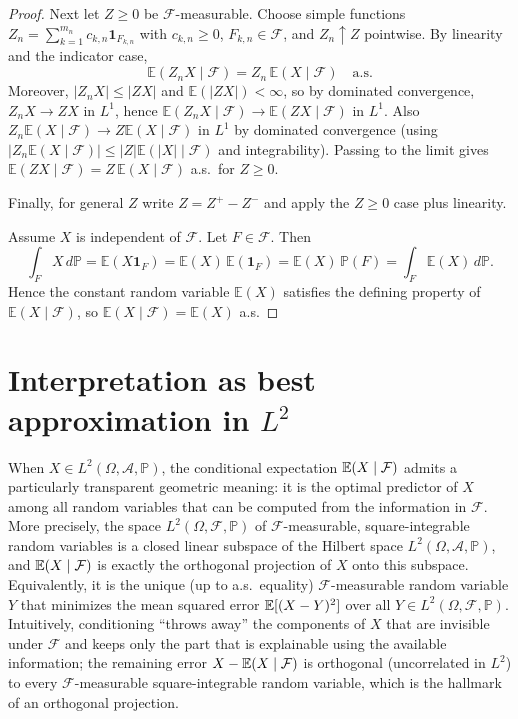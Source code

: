 \begin{proof}
Next let $Z\ge 0$ be $\mathcal F$-measurable. Choose simple functions $Z_n=\sum_{k=1}^{m_n} c_{k,n}\mathbf 1_{F_{k,n}}$
with $c_{k,n}\ge 0$, $F_{k,n}\in\mathcal F$, and $Z_n\uparrow Z$ pointwise.
By linearity and the indicator case,
\[
\mathbb E(Z_n X\mid\mathcal F)=Z_n\,\mathbb E(X\mid\mathcal F)\quad\text{a.s.}
\]
Moreover, $|Z_n X|\le |Z X|$ and $\mathbb E(|Z X|)<\infty$, so by dominated convergence,
$Z_n X\to Z X$ in $L^1$, hence $\mathbb E(Z_n X\mid\mathcal F)\to \mathbb E(ZX\mid\mathcal F)$ in $L^1$.
Also $Z_n\mathbb E(X\mid\mathcal F)\to Z\mathbb E(X\mid\mathcal F)$ in $L^1$ by dominated convergence
(using $|Z_n\mathbb E(X\mid\mathcal F)|\le |Z|\mathbb E(|X|\mid\mathcal F)$ and integrability).
Passing to the limit gives $\mathbb E(ZX\mid\mathcal F)=Z\,\mathbb E(X\mid\mathcal F)$ a.s.\ for $Z\ge 0$.

Finally, for general $Z$ write $Z=Z^+-Z^-$ and apply the $Z\ge 0$ case plus linearity.

Assume $X$ is independent of $\mathcal F$. Let $F\in\mathcal F$. Then
\[
\int_F X\,d\mathbb P=\mathbb E(X\mathbf 1_F)=\mathbb E(X)\,\mathbb E(\mathbf 1_F)=\mathbb E(X)\,\mathbb P(F)
=\int_F \mathbb E(X)\,d\mathbb P.
\]
Hence the constant random variable $\mathbb E(X)$ satisfies the defining property of $\mathbb E(X\mid\mathcal F)$,
so $\mathbb E(X\mid\mathcal F)=\mathbb E(X)$ a.s.
\end{proof}


\section{Interpretation as best approximation in \texorpdfstring{$L^2$}{L2}}

When $X\in L^2(\Omega,\mathcal A,\mathbb P)$, the conditional expectation $\mathbb{E}(X\mid\mathcal F)$ admits a particularly
transparent geometric meaning: it is the optimal predictor of $X$ among all random variables that can be computed from
the information in $\mathcal F$. More precisely, the space $L^2(\Omega,\mathcal F,\mathbb P)$ of $\mathcal F$-measurable,
square-integrable random variables is a closed linear subspace of the Hilbert space $L^2(\Omega,\mathcal A,\mathbb P)$, and
$\mathbb{E}(X\mid\mathcal F)$ is exactly the orthogonal projection of $X$ onto this subspace. Equivalently, it is the unique (up to
a.s.\ equality) $\mathcal F$-measurable random variable $Y$ that minimizes the mean squared error
$\mathbb{E}[(X-Y)^2]$ over all $Y\in L^2(\Omega,\mathcal F,\mathbb P)$. Intuitively, conditioning ``throws away'' the components of
$X$ that are invisible under $\mathcal F$ and keeps only the part that is explainable using the available information; the
remaining error $X-\mathbb{E}(X\mid\mathcal F)$ is orthogonal (uncorrelated in $L^2$) to every $\mathcal F$-measurable square-integrable
random variable, which is the hallmark of an orthogonal projection.

